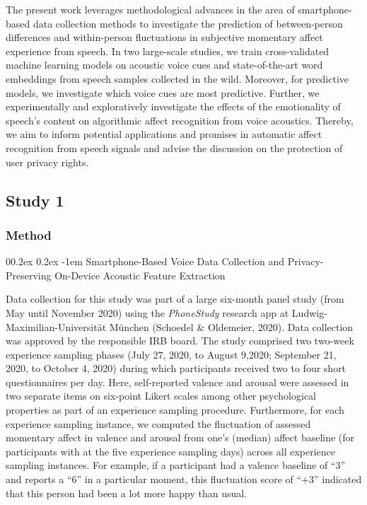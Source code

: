 \documentclass[
  man,floatsintext]{apa6}
\makeatletter
\let\oldparagraph\paragraph
\renewcommand{\paragraph}[1]{\oldparagraph{#1}\mbox{}}
\renewcommand{\paragraph}{\@startsection{paragraph}{4}{\parindent}%
  {0\baselineskip \@plus 0.2ex \@minus 0.2ex}%
  {-1em}%
  {\normalfont\normalsize\bfseries\itshape\typesectitle}}
\makeatother
\begin{document}
The present work leverages methodological advances in the area of smartphone-based data collection methods to investigate the prediction of between-person differences and within-person fluctuations in subjective momentary affect experience from speech. In two large-scale studies, we train cross-validated machine learning models on acoustic voice cues and state-of-the-art word embeddings from speech samples collected in the wild. Moreover, for predictive models, we investigate which voice cues are most predictive. Further, we experimentally and exploratively investigate the effects of the emotionality of speech's content on algorithmic affect recognition from voice acoustics. Thereby, we aim to inform potential applications and promises in automatic affect recognition from speech signals and advise the discussion on the protection of user privacy rights.

\hypertarget{study-1}{%
\subsection{Study 1}\label{study-1}}

\hypertarget{method}{%
\subsubsection{Method}\label{method}}

\hypertarget{smartphone-based-voice-data-collection-and-privacy-preserving-on-device-acoustic-feature-extraction}{%
\paragraph{Smartphone-Based Voice Data Collection and Privacy-Preserving On-Device Acoustic Feature Extraction}\label{smartphone-based-voice-data-collection-and-privacy-preserving-on-device-acoustic-feature-extraction}}

Data collection for this study was part of a large six-month panel study (from May until November 2020) using the \emph{PhoneStudy} research app at Ludwig-Maximilian-Universität München (Schoedel \& Oldemeier, 2020). Data collection was approved by the responsible IRB board. The study comprised two two-week experience sampling phases (July 27, 2020, to August 9,2020; September 21, 2020, to October 4, 2020) during which participants received two to four short questionnaires per day. Here, self-reported valence and arousal were assessed in two separate items on six-point Likert scales among other psychological properties as part of an experience sampling procedure. Furthermore, for each experience sampling instance, we computed the fluctuation of assessed momentary affect in valence and arousal from one's (median) affect baseline (for participants with at the five experience sampling days) across all experience sampling instances. For example, if a participant had a valence baseline of ``3'' and reports a ``6'' in a particular moment, this fluctuation score of ``+3'' indicated that this person had been a lot more happy than usual.
\end{document}
